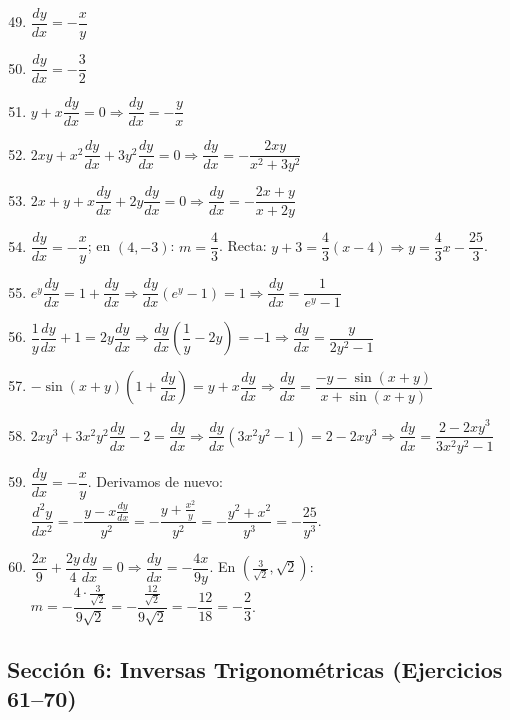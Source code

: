 \documentclass[12pt, a4paper]{article}
\begin{document}
\begin{enumerate}[leftmargin=*, label=\textbf{\arabic*.}]
  \setcounter{enumi}{48}
  \item $\dfrac{dy}{dx} = -\dfrac{x}{y}$
  \item $\dfrac{dy}{dx} = -\dfrac{3}{2}$
  \item $y + x\dfrac{dy}{dx} = 0 \Rightarrow \dfrac{dy}{dx} = -\dfrac{y}{x}$
  \item $2xy + x^2\dfrac{dy}{dx} + 3y^2\dfrac{dy}{dx} = 0 \Rightarrow \dfrac{dy}{dx} = -\dfrac{2xy}{x^2 + 3y^2}$
  \item $2x + y + x\dfrac{dy}{dx} + 2y\dfrac{dy}{dx} = 0 \Rightarrow \dfrac{dy}{dx} = -\dfrac{2x + y}{x + 2y}$
  \item $\dfrac{dy}{dx} = -\dfrac{x}{y}$; en $(4, -3)$: $m = \dfrac{4}{3}$. Recta: $y + 3 = \dfrac{4}{3}(x - 4) \Rightarrow y = \dfrac{4}{3}x - \dfrac{25}{3}$.
  \item $e^y \dfrac{dy}{dx} = 1 + \dfrac{dy}{dx} \Rightarrow \dfrac{dy}{dx}(e^y - 1) = 1 \Rightarrow \dfrac{dy}{dx} = \dfrac{1}{e^y - 1}$
  \item $\dfrac{1}{y}\dfrac{dy}{dx} + 1 = 2y\dfrac{dy}{dx} \Rightarrow \dfrac{dy}{dx}\left(\dfrac{1}{y} - 2y\right) = -1 \Rightarrow \dfrac{dy}{dx} = \dfrac{y}{2y^2 - 1}$
  \item $-\sin(x+y)\left(1 + \dfrac{dy}{dx}\right) = y + x\dfrac{dy}{dx} \Rightarrow \dfrac{dy}{dx} = \dfrac{-y - \sin(x+y)}{x + \sin(x+y)}$
  \item $2xy^3 + 3x^2 y^2 \dfrac{dy}{dx} - 2 = \dfrac{dy}{dx} \Rightarrow \dfrac{dy}{dx}(3x^2 y^2 - 1) = 2 - 2xy^3 \Rightarrow \dfrac{dy}{dx} = \dfrac{2 - 2xy^3}{3x^2 y^2 - 1}$
  \item $\dfrac{dy}{dx} = -\dfrac{x}{y}$. Derivamos de nuevo: $\dfrac{d^2y}{dx^2} = -\dfrac{y - x\frac{dy}{dx}}{y^2} = -\dfrac{y + \frac{x^2}{y}}{y^2} = -\dfrac{y^2 + x^2}{y^3} = -\dfrac{25}{y^3}$.
  \item $\dfrac{2x}{9} + \dfrac{2y}{4}\dfrac{dy}{dx} = 0 \Rightarrow \dfrac{dy}{dx} = -\dfrac{4x}{9y}$. En $\left(\frac{3}{\sqrt{2}}, \sqrt{2}\right)$: $m = -\dfrac{4 \cdot \frac{3}{\sqrt{2}}}{9\sqrt{2}} = -\dfrac{\frac{12}{\sqrt{2}}}{9\sqrt{2}} = -\dfrac{12}{18} = -\dfrac{2}{3}$.
\end{enumerate}

\subsection*{Sección 6: Inversas Trigonométricas (Ejercicios 61--70)}
\end{document}
